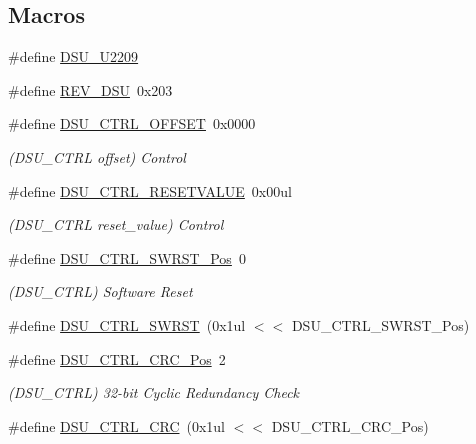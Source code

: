 \subsection*{Macros}
\begin{DoxyCompactItemize}
\item 
\#define \mbox{\hyperlink{group___s_a_m_d21___d_s_u_ga8aec87ba15ad5773fa8672a0b7ac1167}{D\+S\+U\+\_\+\+U2209}}
\item 
\#define \mbox{\hyperlink{group___s_a_m_d21___d_s_u_gaf465c179d3af87802176de84057eaf96}{R\+E\+V\+\_\+\+D\+SU}}~0x203
\item 
\#define \mbox{\hyperlink{group___s_a_m_d21___d_s_u_ga16d35bf197958eb309724f1d0fd8e842}{D\+S\+U\+\_\+\+C\+T\+R\+L\+\_\+\+O\+F\+F\+S\+ET}}~0x0000
\begin{DoxyCompactList}\small\item\em (D\+S\+U\+\_\+\+C\+T\+RL offset) Control \end{DoxyCompactList}\item 
\#define \mbox{\hyperlink{group___s_a_m_d21___d_s_u_ga2d27ac9a8ec8798ed407281b387c2fd0}{D\+S\+U\+\_\+\+C\+T\+R\+L\+\_\+\+R\+E\+S\+E\+T\+V\+A\+L\+UE}}~0x00ul
\begin{DoxyCompactList}\small\item\em (D\+S\+U\+\_\+\+C\+T\+RL reset\+\_\+value) Control \end{DoxyCompactList}\item 
\#define \mbox{\hyperlink{group___s_a_m_d21___d_s_u_ga2d08bbc3f34f53bc95415ac1c3d2ae72}{D\+S\+U\+\_\+\+C\+T\+R\+L\+\_\+\+S\+W\+R\+S\+T\+\_\+\+Pos}}~0
\begin{DoxyCompactList}\small\item\em (D\+S\+U\+\_\+\+C\+T\+RL) Software Reset \end{DoxyCompactList}\item 
\#define \mbox{\hyperlink{group___s_a_m_d21___d_s_u_ga271a775cfa8f562f64ab3a6f0e328a51}{D\+S\+U\+\_\+\+C\+T\+R\+L\+\_\+\+S\+W\+R\+ST}}~(0x1ul $<$$<$ D\+S\+U\+\_\+\+C\+T\+R\+L\+\_\+\+S\+W\+R\+S\+T\+\_\+\+Pos)
\item 
\#define \mbox{\hyperlink{group___s_a_m_d21___d_s_u_ga3f42a18f629eccf5698c46d591b827bc}{D\+S\+U\+\_\+\+C\+T\+R\+L\+\_\+\+C\+R\+C\+\_\+\+Pos}}~2
\begin{DoxyCompactList}\small\item\em (D\+S\+U\+\_\+\+C\+T\+RL) 32-\/bit Cyclic Redundancy Check \end{DoxyCompactList}\item 
\#define \mbox{\hyperlink{group___s_a_m_d21___d_s_u_gaa949503f8848f8d688497ed13a2e29b1}{D\+S\+U\+\_\+\+C\+T\+R\+L\+\_\+\+C\+RC}}~(0x1ul $<$$<$ D\+S\+U\+\_\+\+C\+T\+R\+L\+\_\+\+C\+R\+C\+\_\+\+Pos)

\end{DoxyCompactItemize}
